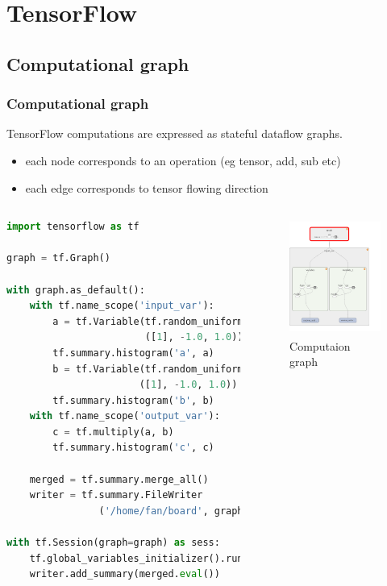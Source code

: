 
\section{TensorFlow}\label{sec:TF}

\subsection{Computational graph}

\begin{frame}[fragile]
  \MyLogo
  \frametitle{Computational graph}  
TensorFlow computations are expressed as stateful dataflow graphs.
\begin{itemize}
\item each node corresponds to an operation (eg tensor, add, sub etc)
\item each edge corresponds to tensor flowing direction
\end{itemize}
%  
\begin{columns}
\tiny{
\begin{lstlisting}[language=python]
import tensorflow as tf

graph = tf.Graph()

with graph.as_default():
	with tf.name_scope('input_var'):
		a = tf.Variable(tf.random_uniform
		                ([1], -1.0, 1.0))
		tf.summary.histogram('a', a)
		b = tf.Variable(tf.random_uniform
		               ([1], -1.0, 1.0))
		tf.summary.histogram('b', b)
	with tf.name_scope('output_var'):
		c = tf.multiply(a, b)
		tf.summary.histogram('c', c)
	
	merged = tf.summary.merge_all()
	writer = tf.summary.FileWriter
	            ('/home/fan/board', graph)

with tf.Session(graph=graph) as sess:
	tf.global_variables_initializer().run()
	writer.add_summary(merged.eval())
\end{lstlisting}
}
%
%
\begin{figure}[htbp] 
   \includegraphics[height=1.5in]{figures/compgraph.png} 
\caption{Computaion graph}
\end{figure}
\end{columns}
\end{frame}

